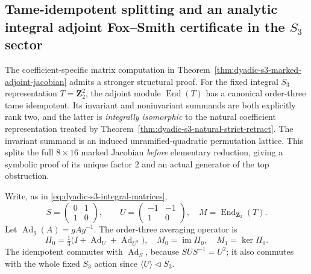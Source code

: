 \documentclass[11pt]{article}
\theoremstyle{definition}
\begin{document}

\subsection{Tame-idempotent splitting and an analytic integral
adjoint Fox--Smith certificate in the $S_3$ sector}
\label{subsec:dyadic-s3-adjoint-tame-splitting}

The coefficient-specific matrix computation in
Theorem~\ref{thm:dyadic-s3-marked-adjoint-jacobian}
admits a stronger structural proof.  For the fixed
integral $S_3$ representation $T=\mathbf Z_2^2$,
the adjoint module $\operatorname{End}(T)$
has a canonical order-three tame idempotent.
Its invariant and noninvariant summands are
both explicitly rank two, and the latter
is \emph{integrally isomorphic} to the natural
coefficient representation treated by
Theorem~\ref{thm:dyadic-s3-natural-strict-retract}.
The invariant summand is an induced
unramified-quadratic permutation lattice.
This splits the full $8\times16$ marked
Jacobian \emph{before} elementary reduction,
giving a symbolic proof of its unique
factor $2$ and an actual generator
of the top obstruction.

Write, as in \eqref{eq:dyadic-s3-integral-matrices},
\[
S=\begin{pmatrix}0&1\\1&0\end{pmatrix},
\qquad
U=\begin{pmatrix}-1&-1\\1&0\end{pmatrix},
\quad
M=\operatorname{End}_{\mathbf Z_2}(T).
\]
Let $\operatorname{Ad}_g(A)=gAg^{-1}$.
The order-three averaging operator is
\begin{equation}\label{eq:dyadic-s3-adjoint-tame-projector}
\boxed{\quad
\Pi_0=\tfrac13
\bigl(I+\operatorname{Ad}_U+
\operatorname{Ad}_{U^2}\bigr),\quad
M_0=\operatorname{im}\Pi_0,\quad
M_1=\ker\Pi_0.
\quad}
\end{equation}
The idempotent commutes with $\operatorname{Ad}_S$,
because $SUS^{-1}=U^2$; it also commutes
with the whole fixed $S_3$ action since
$\langle U\rangle\triangleleft S_3$.
\end{document}
